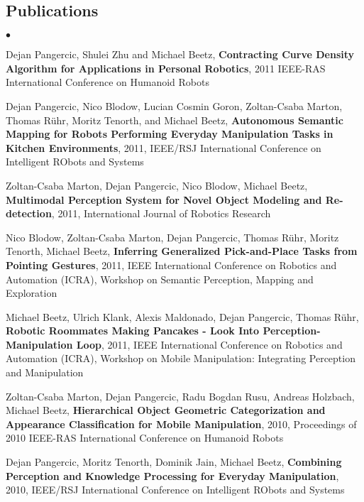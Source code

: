 \documentclass[margin,line]{res}
\newenvironment{list2}{
  \begin{list}{$\bullet$}{%
      \setlength{\itemsep}{0in}
      \setlength{\parsep}{0in} \setlength{\parskip}{0in}
      \setlength{\topsep}{0in} \setlength{\partopsep}{0in} 
      \setlength{\leftmargin}{0.2in}}}{\end{list}}
\begin{document}
\begin{resume}
\section{\sc Publications}
\small{
\begin{list2}
\item Dejan Pangercic, Shulei Zhu and Michael Beetz,
\textbf{Contracting Curve Density Algorithm for Applications in Personal Robotics}, 
2011 IEEE-RAS International Conference on Humanoid Robots \\
\item Dejan Pangercic, Nico Blodow, Lucian Cosmin Goron, Zoltan-Csaba Marton, Thomas R\"uhr, Moritz Tenorth, and Michael Beetz,
\textbf{Autonomous Semantic Mapping for Robots Performing  Everyday Manipulation Tasks in Kitchen Environments}, 
2011, IEEE/RSJ International Conference on Intelligent RObots and Systems \\
\item Zoltan-Csaba Marton, Dejan Pangercic, Nico Blodow, Michael Beetz, \textbf{Multimodal Perception System for Novel Object Modeling and Re-detection}, 2011, International Journal of Robotics Research\\
\item Nico Blodow, Zoltan-Csaba Marton, Dejan Pangercic, Thomas R\"uhr, Moritz Tenorth, Michael Beetz, \textbf{Inferring Generalized Pick-and-Place Tasks from Pointing Gestures}, 2011, IEEE International Conference on Robotics and Automation (ICRA), Workshop on Semantic Perception, Mapping and Exploration\\
\item Michael Beetz, Ulrich Klank, Alexis Maldonado, Dejan Pangercic, Thomas R\"uhr, \textbf{Robotic Roommates Making Pancakes - Look Into Perception-Manipulation Loop}, 2011, IEEE International Conference on Robotics and Automation (ICRA), Workshop on Mobile Manipulation: Integrating Perception and Manipulation\\
\item Zoltan-Csaba Marton, Dejan Pangercic, Radu Bogdan Rusu, Andreas Holzbach, Michael Beetz, \textbf{Hierarchical Object Geometric Categorization and Appearance Classification for Mobile Manipulation}, 2010, Proceedings of 2010 IEEE-RAS International Conference on Humanoid Robots\\
\item Dejan Pangercic, Moritz Tenorth, Dominik Jain, Michael Beetz, \textbf{Combining Perception and Knowledge Processing for Everyday Manipulation}, 2010, IEEE/RSJ International Conference on Intelligent RObots and Systems\\

\end{list2}}
\end{resume}
\end{document}
